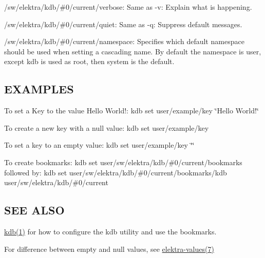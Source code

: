 \begin{DoxyItemize}
\item {\ttfamily /sw/elektra/kdb/\#0/current/verbose}\+: Same as {\ttfamily -\/v}\+: Explain what is happening.
\item {\ttfamily /sw/elektra/kdb/\#0/current/quiet}\+: Same as {\ttfamily -\/q}\+: Suppress default messages.
\item {\ttfamily /sw/elektra/kdb/\#0/current/namespace}\+: Specifies which default namespace should be used when setting a cascading name. By default the namespace is user, except {\ttfamily kdb} is used as root, then {\ttfamily system} is the default.
\end{DoxyItemize}

\subsection*{E\+X\+A\+M\+P\+L\+E\+S}

To set a Key to the value {\ttfamily Hello World!}\+: {\ttfamily kdb set user/example/key \char`\"{}\+Hello World!\char`\"{}}

To create a new key with a null value\+: {\ttfamily kdb set user/example/key}

To set a key to an empty value\+: {\ttfamily kdb set user/example/key \char`\"{}\char`\"{}}

To create bookmarks\+: {\ttfamily kdb set user/sw/elektra/kdb/\#0/current/bookmarks} followed by\+: {\ttfamily kdb set user/sw/elektra/kdb/\#0/current/bookmarks/kdb user/sw/elektra/kdb/\#0/current}

\subsection*{S\+E\+E A\+L\+S\+O}


\begin{DoxyItemize}
\item \hyperlink{md_doc_help_kdb_doc_help_kdb_md}{kdb(1)} for how to configure the kdb utility and use the bookmarks.
\item For difference between empty and null values, see \hyperlink{md_doc_help_elektra-values_doc_help_elektra-values_md}{elektra-\/values(7)} 
\end{DoxyItemize}